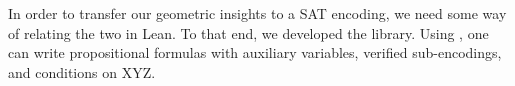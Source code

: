 In order to transfer our geometric insights to a SAT encoding, we need some way of relating the two in Lean.
To that end, we developed the \leansat{} library.
Using \leansat{}, one can write propositional formulas with auxiliary variables, verified sub-encodings, and conditions on XYZ.